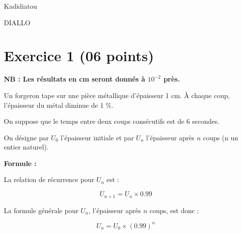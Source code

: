 \documentclass[12pt]{article}
\begin{document}
\begin{minipage}{0.8\textwidth}
    Kadidiatou                          
\end{minipage}
\begin{minipage}{0.8\textwidth}
   DIALLO                          
\end{minipage}
\section*{Exercice 1 (06 points)}
\textbf{NB : Les résultats en cm seront donnés à $10^{-2}$ près.}

Un forgeron tape sur une pièce métallique d'épaisseur 1 cm. À chaque coup, l'épaisseur du métal diminue de 1 \%.

On suppose que le temps entre deux coups consécutifs est de 6 secondes.

On désigne par $U_0$ l'épaisseur initiale et par $U_n$ l'épaisseur après $n$ coups (n un entier naturel).

\textbf{Formule :}

La relation de récurrence pour $U_n$ est :

\[ U_{n+1} = U_n \times 0.99 \]

La formule générale pour $U_n$, l'épaisseur après $n$ coups, est donc :

\[ U_n = U_0 \times (0.99)^n \]
\end{document}
